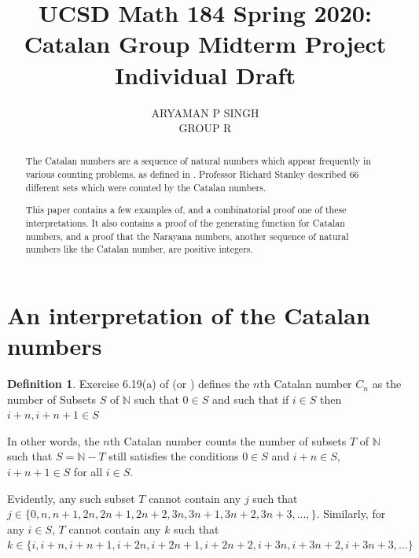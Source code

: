 \documentclass[12pt,reqno]{amsart}
\theoremstyle{definition}
\newtheorem{defn}[thm]{Definition}
\begin{document}
\title[Catalan Group Midterm Project: Individual Draft]{UCSD Math 184 Spring 2020: \\ Catalan Group Midterm Project \\ Individual Draft}

\author{ARYAMAN P SINGH \\ GROUP R} %

\begin{abstract}
  The Catalan numbers are a sequence of natural numbers which appear frequently in various counting problems, as defined in \cite{wiki:catalan}. Professor Richard Stanley described 66 different sets which were counted by the Catalan numbers. 
  
  This paper contains a few examples of, and a combinatorial proof one of these interpretations. It also contains a proof of the generating function for Catalan numbers, and a proof that the Narayana numbers, another sequence of natural numbers like the Catalan number, are positive integers.
\end{abstract}

\maketitle

\section{An interpretation of the Catalan numbers}

\begin{defn}\label{defn:cat.1}
  Exercise 6.19(a) of \cite{MR1676282} (or \cite{stanley_2013}) defines the
  $n$th Catalan number $C_n$ as the number of Subsets $S$ of $\mathbb{N}$ such that $0 \in S$ and such that if $i \in S$ then $i + n, i + n + 1 \in S$
\end{defn}

In other words, the $n$th Catalan number counts the number of subsets $T$ of $\mathbb{N}$ such that $S = \mathbb{N} - T$ still satisfies the conditions $ 0 \in S $ and $ i+n \in S $, $ i+n+1 \in S $ for all $ i \in S $.

Evidently, any such subset $T$ cannot contain any $j$ such that $j \in \{0,n,n+1,2n,2n+1,2n+2,3n,3n+1,3n+2,3n+3,...,\}$. Similarly, for any $i \in S$, $T$ cannot contain any $k$ such that $k \in \{i,i+n,i+n+1,i+2n,i+2n+1,i+2n+2,i+3n,i+3n+2,i+3n+3,...\}$
\end{document}

